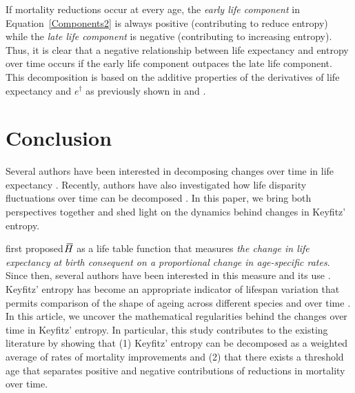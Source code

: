 \documentclass[a4paper,twoside, openright, 12pt, leqno]{article}
\newcommand*\xbar[1]{%
   \hbox{%
     \vbox{%
       \hrule height 0.5pt %
       \kern0.3ex%
       \hbox{%
         \kern-0.25em%
         \ensuremath{#1}%
         \kern-0.05em%
       }%
     }%
   }%
}
\begin{document}
If mortality reductions occur at every age, the \textit{early life component} in Equation~\eqref{Components2} is always positive (contributing to reduce entropy) while the \textit{late life component} is negative (contributing to increasing entropy). Thus, it is clear that a negative relationship between life expectancy and entropy over time occurs if the early life component outpaces the late life component. This decomposition is based on the additive properties of the derivatives of life expectancy and $e^\dagger$ as previously shown in \citet{Vaupel2003} and \citet{Fernandez2015}. 



\section{Conclusion}
 Several authors have been interested in decomposing changes over time in life expectancy \citep{arriaga1984measuring, Vaupel1986, pollard1988decomposition, Vaupel2003, beltran2008integrated, beltran2011unifying}. Recently, authors have also investigated how life disparity fluctuations over time can be decomposed \citep{Wagner2010, Zhang2009, Shkolnikov2011, Aburto2018Eastern}. In this paper, we bring both perspectives together and shed light on the dynamics behind changes in Keyfitz' entropy.
   
 \cite{Keyfitz1977} first proposed $\xbar{H}$ as a life table function that measures \textit{the change in life expectancy at birth consequent on a proportional change in age-specific rates}. Since then, several authors have been interested in this measure and its use \citep{demetrius1978adaptive, Demetrius1979,mitra1978short,Goldman1986,Vaupel1986,Hakkert1987,hill1993entropy,Fernandez2015}. Keyfitz' entropy has become an appropriate indicator of lifespan variation that permits comparison of the shape of ageing across different species and over time \citep{baudisch2013pace,Wrycza2015}. In this article, we uncover the mathematical regularities behind the changes over time in Keyfitz' entropy. In particular, this study contributes to the existing literature by showing that (1) Keyfitz' entropy can be decomposed as a weighted average of rates of mortality improvements and (2) that there exists a threshold age that separates positive and negative contributions of reductions in mortality over time. 
\end{document}
